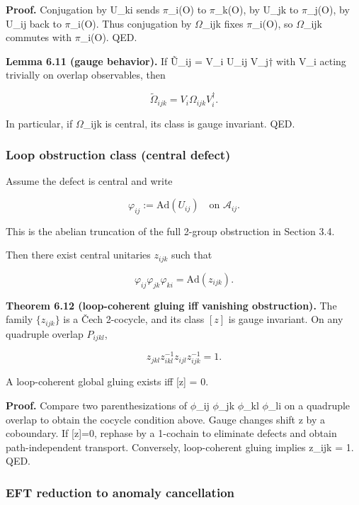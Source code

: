 \textbf{Proof.} Conjugation by U\_ki sends \ensuremath{\pi}\_i(O) to \ensuremath{\pi}\_k(O), by U\_jk to \ensuremath{\pi}\_j(O), by U\_ij back to \ensuremath{\pi}\_i(O). Thus conjugation by \ensuremath{\Omega}\_ijk fixes \ensuremath{\pi}\_i(O), so \ensuremath{\Omega}\_ijk commutes with \ensuremath{\pi}\_i(O). QED.

\textbf{Lemma 6.11 (gauge behavior).} If \~{U}\_ij = V\_i U\_ij V\_j\ensuremath{\dagger} with V\_i acting trivially on overlap observables, then

\[
\tilde{\Omega}_{ijk} = V_i \Omega_{ijk} V_i^\dagger.
\]

In particular, if \ensuremath{\Omega}\_ijk is central, its class is gauge invariant. QED.

\subsubsection{Loop obstruction class (central defect)}\label{66-loop-obstruction-class-central-defect}

Assume the defect is central and write

\[
\varphi_{ij} := \mathrm{Ad}(U_{ij}) \quad \text{on } \mathcal{A}_{ij}.
\]

This is the abelian truncation of the full 2-group obstruction in Section 3.4.

Then there exist central unitaries \(z_{ijk}\) such that

\[
\varphi_{ij} \varphi_{jk} \varphi_{ki} = \mathrm{Ad}(z_{ijk}).
\]

\textbf{Theorem 6.12 (loop-coherent gluing iff vanishing obstruction).} The family \(\{z_{ijk}\}\) is a \v{C}ech 2-cocycle, and its class \([z]\) is gauge invariant. On any quadruple overlap \(P_{ijkl}\),

\[
z_{jkl} z_{ikl}^{-1} z_{ijl} z_{ijk}^{-1} = 1.
\]

A loop-coherent global gluing exists iff {[}z{]} = 0.

\textbf{Proof.} Compare two parenthesizations of \ensuremath{\phi}\_ij \ensuremath{\phi}\_jk \ensuremath{\phi}\_kl \ensuremath{\phi}\_li on a quadruple overlap to obtain the cocycle condition above. Gauge changes shift z by a coboundary. If {[}z{]}=0, rephase by a 1-cochain to eliminate defects and obtain path-independent transport. Conversely, loop-coherent gluing implies z\_ijk = 1. QED.

\subsubsection{EFT reduction to anomaly cancellation}\label{67-eft-reduction-to-anomaly-cancellation}

